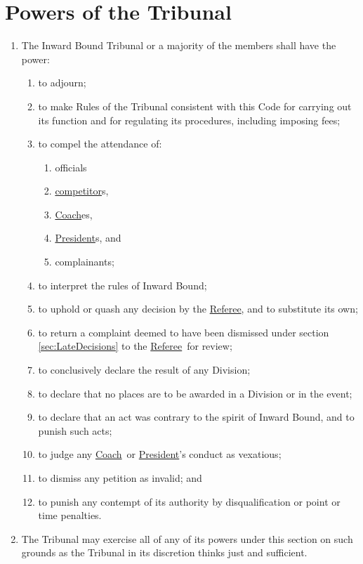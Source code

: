 \documentclass[12pt]{report}
\newcommand{\hyplink}[1]{\hyperlink{#1}{{#1}}}
\newcommand{\Captain}{\hyplink{Coach}}
\newcommand{\Coach}{\hyplink{Coach}}\newcommand{\xCaptain}{Coach}
\newcommand{\competitor}{\hyplink{competitor}}
\newcommand\President{\hyplink{President}}\newcommand\xPresident{President}
\newcommand{\Referee}{\hyplink{Referee}}
\begin{document}
  \section{Powers of the Tribunal}\label{sec:TribunalPowers}
  \begin{enumerate}
    \item The Inward Bound Tribunal or a majority of the members shall have the power:
    \begin{enumerate}
      \item to adjourn;
      \item to make Rules of the Tribunal consistent with this Code for carrying out its function and for regulating its procedures, including imposing  fees;
      \item to compel the attendance of:
      \begin{enumerate}
        \item officials
        \item \competitor s,
        \item \Captain es,
        \item \President s, and
        \item complainants;
      \end{enumerate}
      \item to interpret the rules of Inward Bound;
      \item to uphold or quash any decision by the \Referee, and to substitute its own;
      \item to return a complaint deemed to have been dismissed under section \ref{sec:LateDecisions} to the \Referee\ for review;
      \item to conclusively declare the result of any Division;
      \item to declare that no places are to be awarded in a Division or in the event;
      \item to declare that an act was contrary to the spirit of Inward Bound, and to punish such acts;
      \item to judge any \Coach\ or \President's conduct as vexatious;
      \item to dismiss any petition as invalid; and
      \item to punish any contempt of its authority by disqualification or point or time penalties.
    \end{enumerate}
    \item The Tribunal may exercise all of any of its powers under this section on such grounds as the Tribunal in its discretion thinks just and sufficient.
  \end{enumerate}
\end{document}
